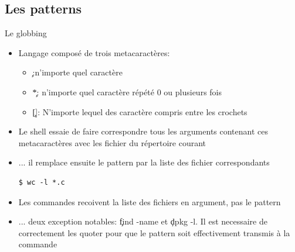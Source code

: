 \subsection{Les patterns}

\begin{frame}[fragile=singleslide]{Le globbing}
  \begin{itemize}
  \item Langage composé de trois metacaractères:
    \begin{itemize}
    \item \c{\?}:n'importe quel caractère
    \item \c{*}: n'importe quel caractère répété 0 ou plusieurs fois
    \item  \c{[]}: N'importe  lequel des  caractère compris  entre les
      crochets
    \end{itemize}
  \item  Le shell  essaie  de faire  correspondre  tous les  arguments
    contenant ces metacaractères avec les fichier du répertoire courant
  \item ...  il remplace ensuite le  pattern par la  liste des fichier
    correspondants
    \begin{lstlisting}
$ wc -l *.c
    \end{lstlisting}
  \item Les commandes recoivent la liste des fichiers en argument, pas
    le pattern
  \item ... deux exception notables: \c{find -name} et \c{dpkg -l}. Il
    est necessaire de correctement les quoter pour que le pattern soit
    effectivement transmis à la commande
  \end{itemize}
\end{frame}

